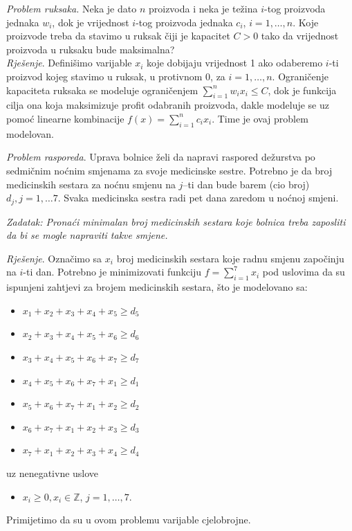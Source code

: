 \documentclass[a4paper, utf8, 11pt, colorlinks]{book}
\begin{document}
\emph{Problem ruksaka.} Neka je dato $n$ proizvoda i neka je težina $i$-tog proizvoda jednaka $w_i$, dok je vrijednost $i$-tog proizvoda jednaka $c_i$, $i=1,\ldots,n$. Koje proizvode treba da stavimo u ruksak  čiji je kapacitet $C>0$ tako da   vrijednost proizvoda u ruksaku bude maksimalna? \\
\emph{Rješenje}. Definišimo varijable $x_i$ koje dobijaju vrijednost 1 ako odaberemo $i$-ti proizvod kojeg stavimo u ruksak, u protivnom 0, za $i=1,\ldots,n$. Ograničenje kapaciteta ruksaka se modeluje ograničenjem $\sum_{i=1}^n w_i x_i \leq C$, dok je funkcija cilja ona koja maksimizuje profit odabranih proizvoda, dakle modeluje se uz pomoć linearne kombinacije $f(x) = \sum_{i=1}^n c_i x_i$. Time je ovaj problem modelovan.


\emph{Problem rasporeda}. Uprava bolnice želi da napravi raspored dežurstva po sedmičnim noćnim smjenama za svoje medicinske sestre. Potrebno je da broj medicinskih sestara za noćnu smjenu na $j$--ti dan bude barem (cio broj) $d_j, j = 1,\ldots 7$. Svaka
medicinska sestra radi pet dana zaredom u noćnoj smjeni. 

\emph{Zadatak: Pronaći minimalan broj medicinskih sestara koje bolnica treba zaposliti da bi se mogle napraviti takve smjene.}

\emph{Rješenje}. Označimo sa $x_i$ broj medicinskih sestara koje radnu smjenu započinju na $i$-ti dan. Potrebno je minimizovati funkciju 
$f = \sum_{i=1}^7 x_i$ pod uslovima da su ispunjeni zahtjevi za brojem medicinskih sestara, što je modelovano sa:
\begin{itemize}
	\item $x_1 + x_2 + x_3 + x_4 + x_5 \geq d_5 $
	\item $x_2 + x_3 + x_4 + x_5 + x_6 \geq d_6$
	\item $x_3 + x_4 + x_5 + x_6 + x_7 \geq d_7$
	\item $x_4 + x_5 + x_6 + x_7 + x_1 \geq d_1 $
	\item $x_5 + x_6 + x_7 + x_1 + x_2   \geq d_2$
	\item $x_6 + x_7 + x_1 + x_2 + x_3  \geq d_3$
	\item $  x_7 + x_1 + x_2 + x_3 + x_4 \geq d_4$
\end{itemize}
uz nenegativne uslove 
\begin{itemize}
	\item $x_i \geq 0, x_i \in \mathbb{Z}$, $j=1,\ldots,7.$
\end{itemize}
Primijetimo da su u ovom problemu varijable  cjelobrojne. %
\end{document}

